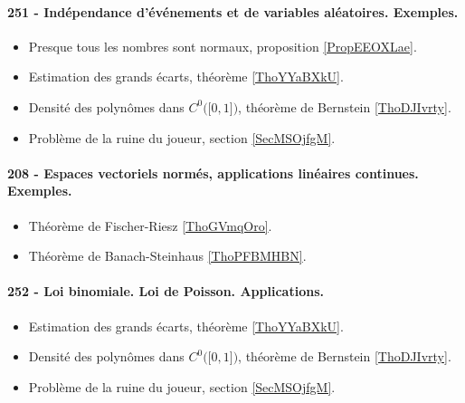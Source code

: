 \paragraph{251 - Indépendance d’événements et de variables aléatoires. Exemples.}
\begin{itemize}
    \item Presque tous les nombres sont normaux, proposition \ref{PropEEOXLae}.
    \item Estimation des grands écarts, théorème \ref{ThoYYaBXkU}.
    \item Densité des polynômes dans \( C^0\big( \mathopen[ 0 , 1 \mathclose] \big)\), théorème de Bernstein \ref{ThoDJIvrty}.
    \item Problème de la ruine du joueur, section \ref{SecMSOjfgM}.
\end{itemize}
\paragraph{208 - Espaces vectoriels normés, applications linéaires continues. Exemples.}
\begin{itemize}
    \item Théorème de Fischer-Riesz \ref{ThoGVmqOro}.
    \item Théorème de Banach-Steinhaus \ref{ThoPFBMHBN}.
\end{itemize}


\paragraph{252 - Loi binomiale. Loi de Poisson. Applications.}
\begin{itemize}
    \item Estimation des grands écarts, théorème \ref{ThoYYaBXkU}.
    \item Densité des polynômes dans \( C^0\big( \mathopen[ 0 , 1 \mathclose] \big)\), théorème de Bernstein \ref{ThoDJIvrty}.
    \item Problème de la ruine du joueur, section \ref{SecMSOjfgM}.
\end{itemize}

